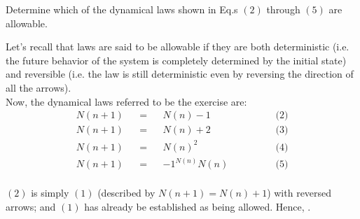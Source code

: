 \documentclass[solutions.tex]{subfiles}
\begin{document}
\maketitle
\begin{exercise}
Determine which of the dynamical laws shown in Eq.s $(2)$ through
$(5)$ are allowable.
\end{exercise}
Let's recall that laws are said to be allowable if they are both
deterministic (i.e. the future behavior of the system is completely
determined by the initial state) and reversible (i.e. the law is
still deterministic even by reversing the direction of all the arrows). \\

Now, the dynamical laws referred to be the exercise are:
\begin{equation*} \begin{aligned}
	N(n+1) &&=&& N(n)-1 &\qquad\qquad \text{(2)} \\
	N(n+1) &&=&& N(n)+2 &\qquad\qquad \text{(3)} \\
	N(n+1) &&=&& N(n)^2 &\qquad\qquad \text{(4)} \\
	N(n+1) &&=&& -1^{N(n)}N(n) &\qquad\qquad \text{(5)} \\
\end{aligned} \end{equation*}

\hr

\begin{figure}[H]
	\centering
\end{figure}

$(2)$ is simply $(1)$ (described by $N(n+1)= N(n)+1$) with reversed
arrows; and $(1)$ has already be established as being allowed. Hence,
.

\hr
\end{document}
